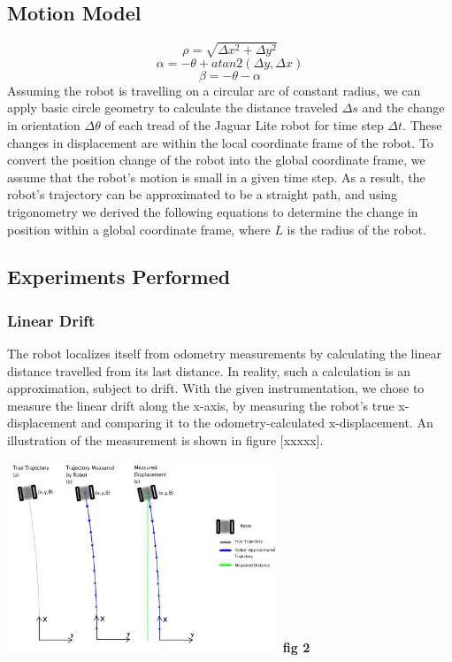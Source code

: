 \documentclass[conference]{IEEEtran}
\begin{document}
\subsection{Motion Model}
\begin{equation}
\rho = \sqrt{\Delta x^2 + \Delta y^2}
\end{equation}
\begin{equation}
\alpha = -\theta + atan2(\Delta y, \Delta x)
\end{equation}
\begin{equation}
\beta = -\theta -\alpha
\end{equation}
Assuming the robot is travelling on a circular arc of constant radius, we can apply basic circle geometry to calculate the distance traveled $\Delta s$ and the change in orientation $\Delta\theta$ of each tread of the Jaguar Lite robot for time step $\Delta t$. These changes in displacement are within the local coordinate frame of the robot. To convert the position change of the robot into the global coordinate frame, we assume that the robot's motion is small in a given time step. As a result, the robot's trajectory can be approximated to be a straight path, and using trigonometry we derived the following equations to determine the change in position within a global coordinate frame, where $L$ is the radius of the robot.

\subsection{Experiments Performed}
\subsubsection{Linear Drift}
The robot localizes itself from odometry measurements by calculating the linear
 distance travelled from its last distance.  In reality, such a calculation is 
an approximation, subject to drift.  
With the given instrumentation, we chose to measure the linear drift along the 
x-axis, by measuring the robot's true x-displacement and comparing it to the 
odometry-calculated x-displacement.  An illustration of the measurement is shown
in figure [xxxxx].



\includegraphics[width = 3.2in]{measurements.png}
\textbf{fig 2}
\end{document}
